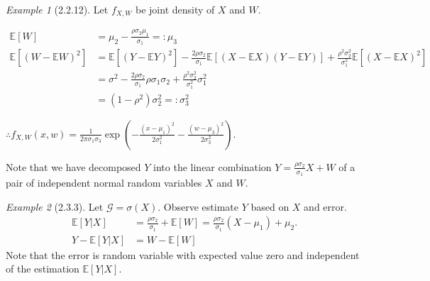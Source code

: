 \documentclass[12pt]{report}
\renewcommand{\1}{\mathbb{1}}
\theoremstyle{break}
\theoremstyle{newdef}
\theoremstyle{remark}
\newtheorem*{exmp}{Example} %
\begin{document}
\begin{appendices}
\begin{exmp}[2.2.12]
Let $f_{X,W}$ be joint density of $X$ and $W$.

$$
\begin{aligned}
\mathbb{E}[W] &= \mu_2 - \frac{\rho\sigma_2\mu_1}{\sigma_1} =: \mu_3\\
\mathbb{E}[(W-\mathbb{E}W)^2] &= \mathbb{E}[(Y-\mathbb{E}Y)^2] - \frac{2\rho\sigma_2}{\sigma_1}\mathbb{E}[(X-\mathbb{E}X)(Y-\mathbb{E}Y)] + \frac{\rho^2\sigma_2^2}{\sigma_1^2}\mathbb{E}[(X-\mathbb{E}X)^2]\\
&= \sigma^2 - \frac{2\rho\sigma_2}{\sigma_1}\rho\sigma_1\sigma_2 + \frac{\rho^2\sigma_2^2}{\sigma_1^2}\sigma_1^2\\
&=(1-\rho^2)\sigma_2^2 =: \sigma_3^2
\end{aligned}
$$

$\therefore f_{X,W}(x,w) = \frac{1}{2\pi\sigma_1\sigma_3} \exp\left(-\frac{(x-\mu_1)^2}{2\sigma_1^2} - \frac{(w-\mu_3)^2}{2\sigma_3^2}\right)$.

Note that we have decomposed $Y$ into the linear combination $Y = \frac{\rho\sigma_2}{\sigma_1}X + W$ of a pair of independent normal random variables $X$ and $W$.

\end{exmp}

\vspace{5mm}

\begin{exmp}[2.3.3]
Let $\mathcal{G} = \sigma(X)$. Observe estimate $Y$ based on $X$ and error.
$$
\begin{aligned}
\mathbb{E}[Y|X] &= \frac{\rho\sigma_2}{\sigma_1} + \mathbb{E}[W] = \frac{\rho\sigma_2}{\sigma_1}(X-\mu_1) + \mu_2.\\
Y-\mathbb{E}[Y|X] &= W - \mathbb{E}[W]
\end{aligned}
$$
Note that the error is random variable with expected value zero and independent of the estimation $\mathbb{E}[Y|X]$.
\end{exmp}

\end{appendices}
\end{document}
